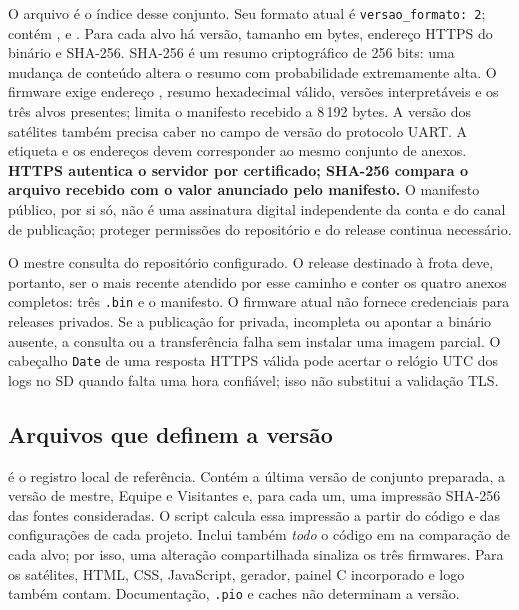O arquivo  é o índice desse conjunto. Seu formato atual é \texttt{versao\_formato: 2}; contém ,  e . Para cada alvo há versão, tamanho em bytes, endereço HTTPS do binário e SHA-256. SHA-256 é um resumo criptográfico de 256 bits: uma mudança de conteúdo altera o resumo com probabilidade extremamente alta. O firmware exige endereço , resumo hexadecimal válido, versões interpretáveis e os três alvos presentes; limita o manifesto recebido a 8\,192 bytes. A versão dos satélites também precisa caber no campo de versão do protocolo UART. A etiqueta e os endereços devem corresponder ao mesmo conjunto de anexos. \textbf{HTTPS autentica o servidor por certificado; SHA-256 compara o arquivo recebido com o valor anunciado pelo manifesto.} O manifesto público, por si só, não é uma assinatura digital independente da conta e do canal de publicação; proteger permissões do repositório e do release continua necessário.

O mestre consulta  do repositório configurado. O release destinado à frota deve, portanto, ser o mais recente atendido por esse caminho e conter os quatro anexos completos: três \texttt{.bin} e o manifesto. O firmware atual não fornece credenciais para releases privados. Se a publicação for privada, incompleta ou apontar a binário ausente, a consulta ou a transferência falha sem instalar uma imagem parcial. O cabeçalho \texttt{Date} de uma resposta HTTPS válida pode acertar o relógio UTC dos logs no SD quando falta uma hora confiável; isso não substitui a validação TLS.

\subsection{Arquivos que definem a versão}
 é o registro local de referência. Contém a última versão de conjunto preparada, a versão de mestre, Equipe e Visitantes e, para cada um, uma impressão SHA-256 das fontes consideradas. O script  calcula essa impressão a partir do código e das configurações de cada projeto. Inclui também \emph{todo} o código em  na comparação de cada alvo; por isso, uma alteração compartilhada sinaliza os três firmwares. Para os satélites, HTML, CSS, JavaScript, gerador, painel C incorporado e logo também contam. Documentação, \texttt{.pio} e caches não determinam a versão.

